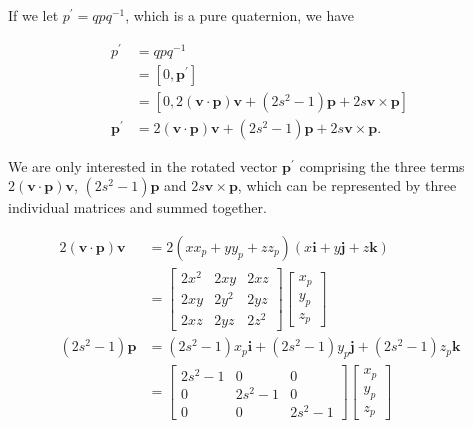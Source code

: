 If we let $p^{\prime}=q p q^{-1}$, which is a pure quaternion, we have

$$
\begin{aligned}
p^{\prime} & =q p q^{-1} \\
& =\left[0, \mathbf{p}^{\prime}\right] \\
& =\left[0,2(\mathbf{v} \cdot \mathbf{p}) \mathbf{v}+\left(2 s^{2}-1\right) \mathbf{p}+2 s \mathbf{v} \times \mathbf{p}\right] \\
\mathbf{p}^{\prime} & =2(\mathbf{v} \cdot \mathbf{p}) \mathbf{v}+\left(2 s^{2}-1\right) \mathbf{p}+2 s \mathbf{v} \times \mathbf{p} .
\end{aligned}
$$

We are only interested in the rotated vector $\mathbf{p}^{\prime}$ comprising the three terms $2(\mathbf{v} \cdot \mathbf{p}) \mathbf{v}$, $\left(2 s^{2}-1\right) \mathbf{p}$ and $2 s \mathbf{v} \times \mathbf{p}$, which can be represented by three individual matrices and summed together.

$$
\begin{aligned}
2(\mathbf{v} \cdot \mathbf{p}) \mathbf{v} & =2\left(x x_{p}+y y_{p}+z z_{p}\right)(x \mathbf{i}+y \mathbf{j}+z \mathbf{k}) \\
& =\left[\begin{array}{lll}
2 x^{2} & 2 x y & 2 x z \\
2 x y & 2 y^{2} & 2 y z \\
2 x z & 2 y z & 2 z^{2}
\end{array}\right]\left[\begin{array}{l}
x_{p} \\
y_{p} \\
z_{p}
\end{array}\right] \\
\left(2 s^{2}-1\right) \mathbf{p} & =\left(2 s^{2}-1\right) x_{p} \mathbf{i}+\left(2 s^{2}-1\right) y_{p} \mathbf{j}+\left(2 s^{2}-1\right) z_{p} \mathbf{k} \\
& =\left[\begin{array}{ccc}
2 s^{2}-1 & 0 & 0 \\
0 & 2 s^{2}-1 & 0 \\
0 & 0 & 2 s^{2}-1
\end{array}\right]\left[\begin{array}{l}
x_{p} \\
y_{p} \\
z_{p}
\end{array}\right]
\end{aligned}
$$

